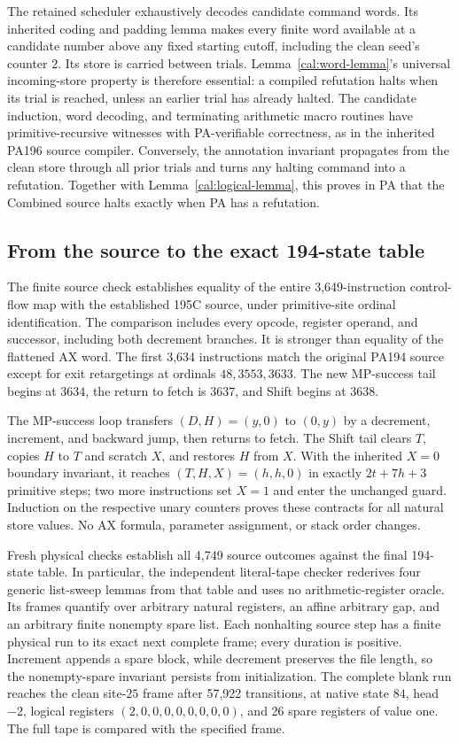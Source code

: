 The retained scheduler exhaustively decodes candidate command words.
Its inherited coding and padding lemma makes every finite word
available at a candidate number above any fixed starting cutoff,
including the clean seed's counter $2$.  Its store is carried between
trials.  Lemma~\ref{cal:word-lemma}'s universal incoming-store
property is therefore essential: a compiled refutation halts when
its trial is reached, unless an earlier trial has already halted.
The candidate induction, word decoding, and terminating arithmetic
macro routines have primitive-recursive witnesses with PA-verifiable
correctness, as in the inherited PA196 source compiler.
Conversely, the annotation invariant propagates from the clean store
through all prior trials and turns any halting command into a
refutation.  Together with Lemma~\ref{cal:logical-lemma}, this proves
in PA that the Combined source halts exactly when PA has a refutation.

\subsection{From the source to the exact 194-state table}
\label{cal:physical}

The finite source check establishes equality of the entire
3,649-instruction control-flow map with the established 195C source,
under primitive-site ordinal identification.  The comparison includes
every opcode, register operand, and successor, including both decrement
branches.  It is stronger than equality of the flattened AX word.
The first 3,634 instructions match the original PA194 source except
for exit retargetings at ordinals $48,3553,3633$.  The new MP-success
tail begins at $3634$, the return to fetch is $3637$, and Shift
begins at $3638$.

The MP-success loop transfers $(D,H)=(y,0)$ to $(0,y)$ by a
decrement, increment, and backward jump, then returns to fetch.
The Shift tail clears $T$, copies $H$ to $T$ and scratch $X$,
and restores $H$ from $X$.  With the inherited $X=0$ boundary
invariant, it reaches $(T,H,X)=(h,h,0)$ in exactly
$2t+7h+3$ primitive steps; two more instructions set $X=1$ and
enter the unchanged guard.  Induction on the respective unary
counters proves these contracts for all natural store values.
No AX formula, parameter assignment, or stack order changes.

Fresh physical checks establish all 4,749 source outcomes against
the final 194-state table.  In particular, the independent literal-tape
checker rederives four generic list-sweep lemmas from that table and
uses no arithmetic-register oracle.  Its frames quantify over arbitrary
natural registers, an affine arbitrary gap, and an arbitrary finite
nonempty spare list.  Each nonhalting source step has a finite physical
run to its exact next complete frame; every duration is positive.
Increment appends a spare block, while decrement preserves the file
length, so the nonempty-spare invariant persists from initialization.
The complete blank run reaches the clean site-$25$ frame after
57,922 transitions, at native state $84$, head $-2$, logical registers
$(2,0,0,0,0,0,0,0,0)$, and 26 spare registers of value one.
The full tape is compared with the specified frame.

